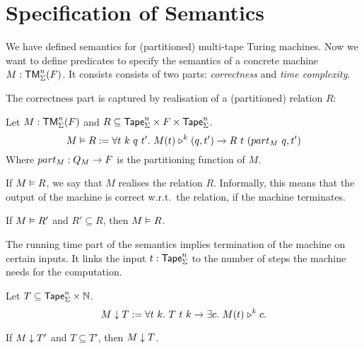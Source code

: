 \section{Specification of Semantics}
\label{sec:spec_semantics}

We have defined semantics for (partitioned) multi-tape Turing machines.  Now we want to define predicates to specify the semantics of a concrete
machine $M: \mathsf{TM}_\Sigma^n(F)$.  It consists consists of two parts: \emph{correctness} and \emph{time complexity}.

The correctness part is captured by realisation of a (partitioned) relation $R$:

\begin{definition}[Realisation][Realise]
  \label{def:realisation}
  Let $M:\mathsf{TM}_\Sigma^n(F)$ and $R \subseteq \mathsf{Tape}_\Sigma^n \times F \times \mathsf{Tape}_\Sigma^n$.
  \[
    M \mathrel{\vDash} R :=
    \forall t~k~q~t'.~M(t) \mathrel{\triangleright}^k (q, t') \rightarrow
    R~t~(part_M~q, t')
  \]
  Where $part_M : Q_M \rightarrow F$ is the partitioning function of $M$.
\end{definition}

If $M \mathrel{\vDash} R$, we say that $M$ realises the relation $R$.  Informally, this means that the output of the machine is correct w.r.t.\ the relation,
if the machine terminates.

\begin{lemma}
  \label{lem:Realise_monotone}
  If $M \mathrel{\vDash} R'$ and $R' \subseteq R$, then $M \mathrel{\vDash} R$.
\end{lemma}

The running time part of the semantics implies termination of the machine on certain inputs.  It links the input $t:\mathsf{Tape}_\Sigma^n$ to the number of steps
the machine needs for the computation.

\begin{definition}
  \label{def:TerminatesIn}
  Let $T \subseteq \mathsf{Tape}_\Sigma^n \times \mathbb{N}$.
  \[
    M \mathrel{\downarrow} T :=
    \forall t~k.~T~t~k \rightarrow
    \exists c.~M (t) \mathrel{\triangleright}^k c.
  \]
\end{definition}


\begin{lemma}
  \label{lem:TerminatesIn_monotone}
  If $M \mathrel{\downarrow} T'$ and $T \subseteq T'$, then $M \mathrel{\downarrow} T$.
\end{lemma}

